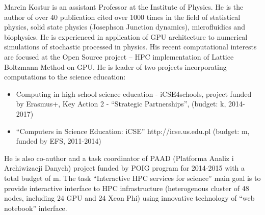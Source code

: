 \begin{participant}[type=leadPI,PM=12,salary=2000,gender=male]{Marcin Kostur}
is an assistant Professor at the Institute of Physics. He is the author of over 40
publication cited over 1000 times in the field of statistical physics,
solid state physics (Josephson Junction dynamics), microfluidics and
biophysics. He is experienced in application of GPU architecture to
numerical simulations of stochastic processed in physics. His recent
computational interests are focused at the Open Source project
 -- HPC implementation of Lattice Boltzmann Method on GPU.
He is leader of two projects incorporating computations to the science education:
\begin{itemize}
\item Computing in high school science education - iCSE4schools,
  project funded by Erasmus+, Key Action 2 - ``Strategic Partnerships'',
  (budget: k, 2014-2017)
\item ``Computers in Science Education: iCSE'' http://icse.us.edu.pl
  (budget: m, funded by EFS, 2011-2014)
\end{itemize}
He is also co-author and a task coordinator of PAAD (Platforma Analiz i
Archiwizacji Danych) project funded by POIG program for 2014-2015 with a total budget
of m. The task ``Interactive HPC services for science''
main goal is to provide interactive interface to HPC infrastructure
(heterogenous cluster of 48 nodes, including 24 GPU and 24 Xeon Phi)
using innovative technology of ``web notebook'' interface.  
\end{participant}
